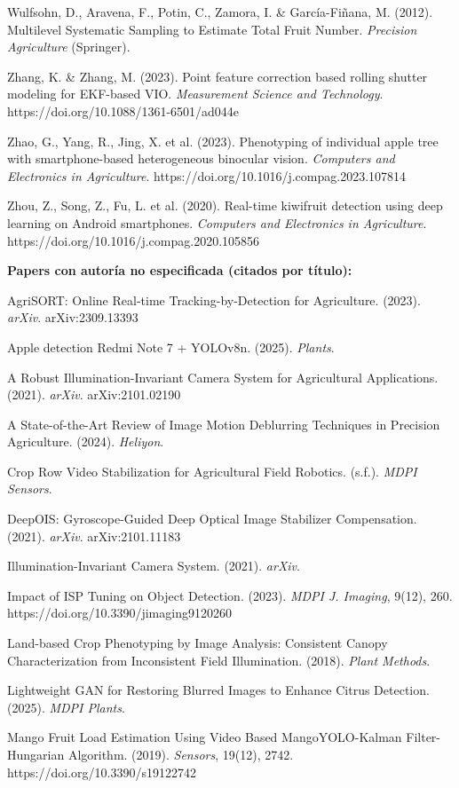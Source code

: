 Wulfsohn, D., Aravena, F., Potin, C., Zamora, I. \& García-Fiñana, M. (2012). Multilevel Systematic Sampling to Estimate Total Fruit Number. \textit{Precision Agriculture} (Springer).


Zhang, K. \& Zhang, M. (2023). Point feature correction based rolling shutter modeling for EKF-based VIO. \textit{Measurement Science and Technology}. https://doi.org/10.1088/1361-6501/ad044e


Zhao, G., Yang, R., Jing, X. et al. (2023). Phenotyping of individual apple tree with smartphone-based heterogeneous binocular vision. \textit{Computers and Electronics in Agriculture}. https://doi.org/10.1016/j.compag.2023.107814


Zhou, Z., Song, Z., Fu, L. et al. (2020). Real-time kiwifruit detection using deep learning on Android smartphones. \textit{Computers and Electronics in Agriculture}. https://doi.org/10.1016/j.compag.2020.105856


\textbf{Papers con autoría no especificada (citados por título):}


AgriSORT: Online Real-time Tracking-by-Detection for Agriculture. (2023). \textit{arXiv}. arXiv:2309.13393


Apple detection Redmi Note 7 + YOLOv8n. (2025). \textit{Plants}.


A Robust Illumination-Invariant Camera System for Agricultural Applications. (2021). \textit{arXiv}. arXiv:2101.02190


A State-of-the-Art Review of Image Motion Deblurring Techniques in Precision Agriculture. (2024). \textit{Heliyon}.


Crop Row Video Stabilization for Agricultural Field Robotics. (s.f.). \textit{MDPI Sensors}.


DeepOIS: Gyroscope-Guided Deep Optical Image Stabilizer Compensation. (2021). \textit{arXiv}. arXiv:2101.11183


Illumination-Invariant Camera System. (2021). \textit{arXiv}.


Impact of ISP Tuning on Object Detection. (2023). \textit{MDPI J. Imaging}, 9(12), 260. https://doi.org/10.3390/jimaging9120260


Land-based Crop Phenotyping by Image Analysis: Consistent Canopy Characterization from Inconsistent Field Illumination. (2018). \textit{Plant Methods}.


Lightweight GAN for Restoring Blurred Images to Enhance Citrus Detection. (2025). \textit{MDPI Plants}.


Mango Fruit Load Estimation Using Video Based MangoYOLO-Kalman Filter-Hungarian Algorithm. (2019). \textit{Sensors}, 19(12), 2742. https://doi.org/10.3390/s19122742


